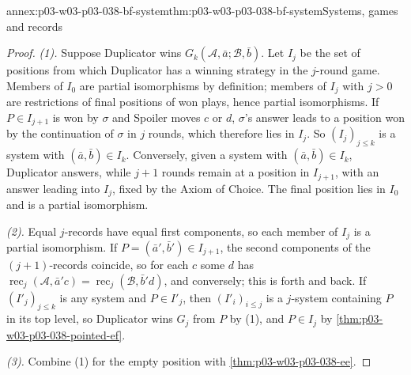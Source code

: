 \begin{annexitem}{annex:p03-w03-p03-038-bf-system}{thm:p03-w03-p03-038-bf-system}{Systems, games and records}
\begin{proof}
\emph{(1).} Suppose Duplicator wins
\(G_k(\mathcal A,\bar a;\mathcal B,\bar b)\). Let \(I_j\) be the set of
positions from which Duplicator has a winning strategy in the \(j\)-round
game. Members of \(I_0\) are partial isomorphisms by definition; members of
\(I_j\) with \(j>0\) are restrictions of final positions of won plays, hence
partial isomorphisms. If \(P\in I_{j+1}\) is won by \(\sigma\) and Spoiler
moves \(c\) or \(d\), \(\sigma\)'s answer leads to a position won by the
continuation of \(\sigma\) in \(j\) rounds, which therefore lies in \(I_j\).
So \((I_j)_{j\le k}\) is a system with \((\bar a,\bar b)\in I_k\). Conversely,
given a system with \((\bar a,\bar b)\in I_k\), Duplicator answers, while
\(j+1\) rounds remain at a position in \(I_{j+1}\), with an answer leading
into \(I_j\), fixed by the Axiom of Choice. The final position lies in
\(I_0\) and is a partial isomorphism.

\emph{(2).} Equal \(j\)-records have equal first components, so each member of
\(I_j\) is a partial isomorphism. If \(P=(\bar a',\bar b')\in I_{j+1}\), the
second components of the \((j+1)\)-records coincide, so for each \(c\) some
\(d\) has \(\operatorname{rec}_j(\mathcal A,\bar a'c)=\operatorname{rec}_j(\mathcal B,\bar b'd)\),
and conversely; this is forth and back. If \((I'_j)_{j\le k}\) is any system
and \(P\in I'_j\), then \((I'_i)_{i\le j}\) is a \(j\)-system containing
\(P\) in its top level, so Duplicator wins \(G_j\) from \(P\) by (1), and
\(P\in I_j\) by \cref{thm:p03-w03-p03-038-pointed-ef}.

\emph{(3).} Combine (1) for the empty position with
\cref{thm:p03-w03-p03-038-ee}.
\end{proof}
\end{annexitem}

